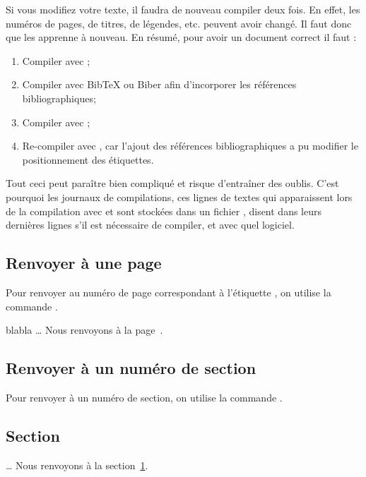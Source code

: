 \begin{attention}
    Si vous modifiez votre texte, il faudra de nouveau compiler deux fois. En effet, les numéros de pages, de titres, de légendes, etc. peuvent avoir changé. Il faut donc  que \XeLaTeX{} les apprenne à nouveau. En résumé, pour avoir un document correct il faut :
    \begin{enumerate}
        \item Compiler avec \XeLaTeX{};
        \item Compiler avec BibTeX ou Biber afin d'incorporer les références bibliographiques;
        \item Compiler avec \XeLaTeX{};
        \item Re-compiler avec \XeLaTeX{}, car l'ajout des références bibliographiques a pu modifier le positionnement des étiquettes.
    \end{enumerate}
    
    Tout ceci peut paraître bien compliqué et risque d'entraîner des oublis. C'est pourquoi les journaux de compilations, ces lignes de textes qui apparaissent lors de la compilation avec \XeLaTeX{} et sont stockées dans un fichier , disent dans leurs dernières lignes s'il est nécessaire de compiler, et avec quel logiciel.
\end{attention}

\subsection{Renvoyer à une page}

Pour renvoyer au numéro de page correspondant à l'étiquette , on utilise la commande .

\begin{latexcode}
blabla \label{etiquette}
…
Nous renvoyons à la page~\pageref{etiquette}.
\end{latexcode}

\subsection{Renvoyer à un numéro de section}

Pour renvoyer à un numéro de section, on utilise la commande .

\begin{latexcode}
\section{Section} \label{etiquette}
…
Nous renvoyons à la section~\ref{etiquette}.
\end{latexcode}
 
